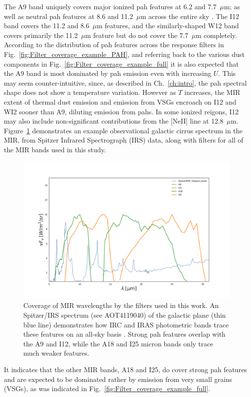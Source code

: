          The A9 band uniquely covers major ionized \acrshort{pah} features at 6.2 and 7.7~$\mu$m; as well as neutral \acrshort{pah} features at 8.6 and 11.2~$\mu$m across the entire sky \citep{irc07}. The I12 band covers the 11.2 and 8.6~$\mu$m features, and the similarly-shaped W12 band covers primarily the 11.2~$\mu{}$m feature but do not cover the 7.7~$\mu{}$m completely. According to the distribution of \acrshort{pah} features across the response filters in Fig.~\ref{fig:Filter_coverage_example_PAH}, and referring back to the various dust components in Fig.~\ref{fig:Filter_coverage_example_full} it is also expected that the A9 band is most dominated by \acrshort{pah} emission even with increasing $U$. This may seem counter-intuitive, since, as described in Ch.~\ref{ch:intro}, the \acrshort{pah} spectral shape does not show a temperature variation. However as $T$ increases, the MIR extent of thermal dust emission and emission from VSGs encroach on I12 and WI2 sooner than A9, diluting emission from \acrshort{pah}s. In some ionized reigons, I12 may also include non-significant contributions from the [NeII] line at 12.8~$\mu$m. Figure~\ref{fig:Filter_coverage_example_MIR} demonstrates an example observational galactic cirrus spectrum in the MIR, from Spitzer Infrared Spectrograph (IRS) \citep{spitzer04} data, along with filters for all of the MIR bands used in this study.
             \begin{figure}
               \centering
               \includegraphics[width=\textwidth]{../Plots/ch_datasources/Filter_coverage_example_MIR.pdf}
               \caption{Coverage of MIR wavelengths by the filters used in this work. An Spitzer/IRS spectrum (see AOT4119040) of the galactic plane (thin blue line) demonstrates how IRC and IRAS photometric bands trace these features on an all-sky basis \citep{ishihara07}. Strong \acrshort{pah} features overlap with the A9 and I12, while the A18 and I25 micron bands only trace much weaker features. }
               \label{fig:Filter_coverage_example_MIR}
             \end{figure}
         It indicates that the other MIR bands, A18 and I25, do cover strong \acrshort{pah} features and are expected to be dominated rather by emission from very small grains (VSGs), as was indicated in Fig.~\ref{fig:Filter_coverage_example_full}.

